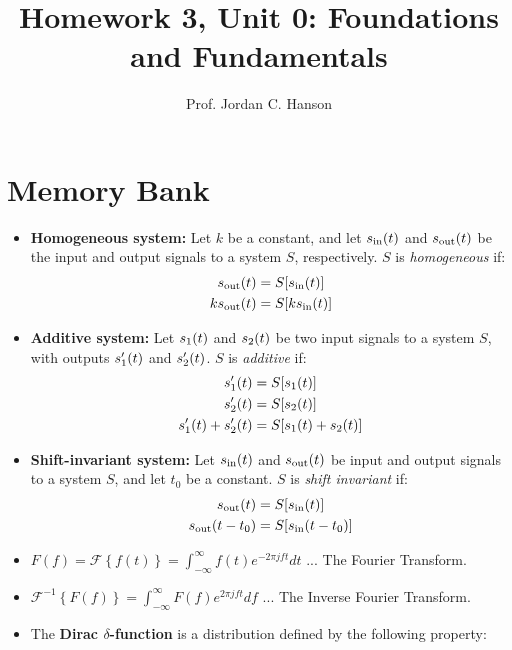 \documentclass{article}
\begin{document}
\twocolumn

\title{Homework 3, Unit 0: Foundations and Fundamentals}
\author{Prof. Jordan C. Hanson}

\maketitle

\section{Memory Bank}
\small
\begin{itemize}
\item \textbf{Homogeneous system:} Let $k$ be a constant, and let $s_{\rm in}(t)$ and $s_{\rm out}(t)$ be the input and output signals to a system $S$, respectively.  $S$ is \textit{homogeneous} if:
\begin{align}
s_{\rm out}(t) &= S[s_{\rm in}(t)] \\
k s_{\rm out}(t) &= S[k s_{\rm in}(t)]
\end{align}
\item \textbf{Additive system:} Let $s_{\rm 1}(t)$ and $s_{\rm 2}(t)$ be two input signals to a system $S$, with outputs $s'_{\rm 1}(t)$ and $s'_{\rm 2}(t)$.  $S$ is \textit{additive} if:
\begin{align}
s'_{\rm 1}(t) &= S[s_{\rm 1}(t)] \\
s'_{\rm 2}(t) &= S[s_{\rm 2}(t)] \\
s'_{\rm 1}(t)+s'_{\rm 2}(t) &= S[s_{\rm 1}(t)+s_{\rm 2}(t)]
\end{align}
\item \textbf{Shift-invariant system:} Let $s_{\rm in}(t)$ and $s_{\rm out}(t)$ be input and output signals to a system $S$, and let $t_0$ be a constant.  $S$ is \textit{shift invariant} if:
\begin{align}
s_{\rm out}(t) &= S[s_{\rm in}(t)] \\
s_{\rm out}(t-t_0) &= S[s_{\rm in}(t-t_0)]
\end{align}
\item $F(f) = \mathcal{F}\left\lbrace f(t)\right\rbrace =\int_{-\infty}^{\infty} f(t) e^{-2\pi jft} dt$ ... The Fourier Transform.
\item $\mathcal{F}^{-1}\left\lbrace F(f)\right\rbrace =\int_{-\infty}^{\infty} F(f) e^{2\pi jft} df$ ... The Inverse Fourier Transform.
\item The \textbf{Dirac $\delta$-function} is a distribution defined by the following property:
\begin{equation}

\end{equation}
\end{itemize}
\end{document}
